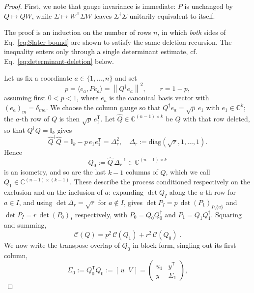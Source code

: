 \documentclass[prx,twocolumn,superscriptaddress,aps,10pt, frontmatterverbose, reprint,footinbib,longbibliography=true]{revtex4-2}
\newcommand{\trans}{\mathsf{T}}
\begin{document}
\begin{proof}
First, we note that gauge invariance is immediate: $P$ is unchanged by $Q\mapsto QW$, while $\Sigma\mapsto W^{\trans}\Sigma W$ leaves $\Sigma^\dagger\Sigma$ unitarily equivalent to itself.

The proof is an induction on the number of rows $n$, in which \emph{both} sides of Eq.~\eqref{eq:Slater-bound} are shown to satisfy the same deletion recursion. The inequality enters only through a single determinant estimate, cf. Eq.~\eqref{eq:determinant-deletion} below.


Let us fix a coordinate $a\in \{1,\dots,n\}$ and set
\begin{equation}
    p=\langle e_a, P e_a\rangle=\left\lVert Q^\dagger e_a\right\rVert^2 ,\qquad r=1-p ,
\end{equation}
assuming first $0<p<1$, where $e_a$ is the canonical basis vector with $(e_a)_m=\delta_{ma}$.
We choose the column gauge so that $Q^\dagger e_a=\sqrt p\,e_1$ with $e_1\in\mathbb{C}^k$; the $a$-th row of $Q$ is then $\sqrt p\,e_1^{\trans}$. Let $\widehat Q\in\mathbb{C}^{(n-1)\times k}$ be $Q$ with that row deleted, so that $Q^\dagger Q=\mathbb{I}_k$ gives
\begin{equation}
    \widehat Q^\dagger\widehat Q=\mathbb{I}_k-p\,e_1e_1^{\trans}=\Delta_r^2 ,
    \quad
    \Delta_r:=\mathrm{diag}(\sqrt r,1,\dots,1).\end{equation}
Hence
\begin{equation}
    Q_0:=\widehat Q\,\Delta_r^{-1}\in\mathbb{C}^{(n-1)\times k}
\end{equation}
is an isometry, and so are the last $k-1$ columns of $\widehat Q$, which we call $Q_1\in\mathbb{C}^{(n-1)\times(k-1)}$. These describe the process conditioned respectively on the exclusion and on the inclusion of $a$: expanding $\det Q_I$ along the $a$-th row for $a\in I$, and using $\det\Delta_r=\sqrt r$ for $a\notin I$, gives $\det P_I=p\,\det (P_1)_{I\setminus\{a\}}$ and $\det P_I=r\,\det (P_0)_I$ respectively, with $P_0=Q_0Q_0^\dagger$ and $P_1=Q_1Q_1^\dagger$. Squaring and summing,
\begin{equation}
    \mathcal{C}(Q)=p^2\,\mathcal{C}(Q_1)+r^2\,\mathcal{C}(Q_0)\;.
    \label{eq:collision-deletion}
\end{equation}
We now write the transpose overlap of $Q_0$ in block form, singling out its first column,
\begin{equation}
\Sigma_0:=Q_0^{\trans}Q_0:=\left[\,u\;\;V\,\right]
    =\begin{pmatrix} u_1&y^{\trans}\\ y&\Sigma_1\end{pmatrix},

\end{equation}
\end{proof}
\end{document}
